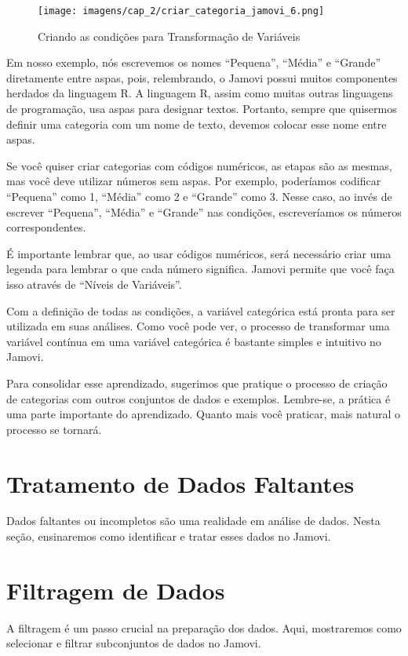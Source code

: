 \begin{figure}[H]
    \centering
    \caption{Criando as condições para Transformação de Variáveis}
    \texttt{[image: imagens/cap\_2/criar\_categoria\_jamovi\_6.png]}
    \label{fig:criar_categoria_jamovi_6}
\end{figure}

Em nosso exemplo, nós escrevemos os nomes ``Pequena'', ``Média'' e ``Grande'' diretamente entre aspas, pois, relembrando, o Jamovi possui muitos componentes herdados da linguagem R. A linguagem R, assim como muitas outras linguagens de programação, usa aspas para designar textos. Portanto, sempre que quisermos definir uma categoria com um nome de texto, devemos colocar esse nome entre aspas.

Se você quiser criar categorias com códigos numéricos, as etapas são as mesmas, mas você deve utilizar números sem aspas. Por exemplo, poderíamos codificar ``Pequena'' como 1, ``Média'' como 2 e ``Grande'' como 3. Nesse caso, ao invés de escrever ``Pequena'', ``Média'' e ``Grande'' nas condições, escreveríamos os números correspondentes.

É importante lembrar que, ao usar códigos numéricos, será necessário criar uma legenda para lembrar o que cada número significa. Jamovi permite que você faça isso através de ``Níveis de Variáveis''.

Com a definição de todas as condições, a variável categórica está pronta para ser utilizada em suas análises. Como você pode ver, o processo de transformar uma variável contínua em uma variável categórica é bastante simples e intuitivo no Jamovi.

Para consolidar esse aprendizado, sugerimos que pratique o processo de criação de categorias com outros conjuntos de dados e exemplos. Lembre-se, a prática é uma parte importante do aprendizado. Quanto mais você praticar, mais natural o processo se tornará.

\section{Tratamento de Dados Faltantes}
Dados faltantes ou incompletos são uma realidade em análise de dados. Nesta seção, ensinaremos como identificar e tratar esses dados no Jamovi.

\section{Filtragem de Dados}
A filtragem é um passo crucial na preparação dos dados. Aqui, mostraremos como selecionar e filtrar subconjuntos de dados no Jamovi.

